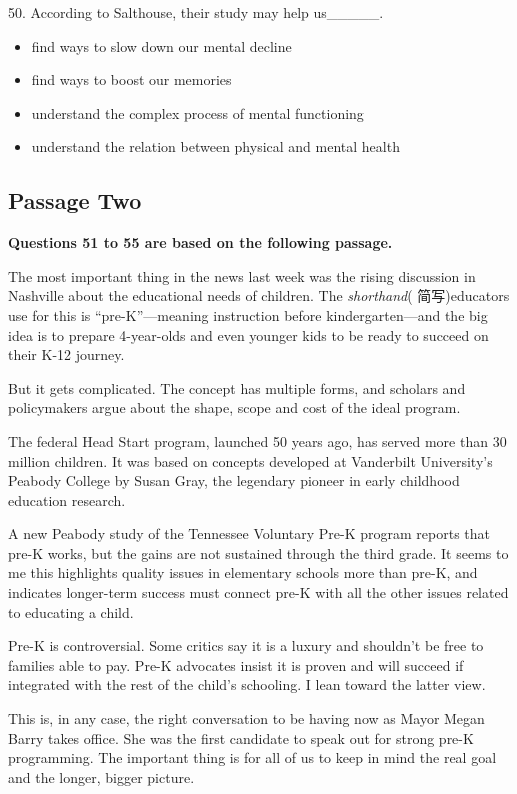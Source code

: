 \documentclass[UTF8,11pt]{ctexart}
\begin{document}
50. According to Salthouse, their study may help us\_\_\_\_\_.


\begin{itemize}[leftmargin=2em,itemsep=.2em,topsep=.4em]\item[A.] find ways to slow down our mental decline
\item[B.] find ways to boost our memories
\item[C.] understand the complex process of mental functioning
\item[D.] understand the relation between physical and mental health
\end{itemize}

\subsection*{\textbf{Passage Two}}


\textbf{Questions 51 to 55 are based on the following passage.}


The most important thing in the news last week was the rising discussion in Nashville about the educational needs of children. The\textit{ shorthand}( 简写)educators use for this is “pre-K”—meaning instruction before kindergarten—and the big idea is to prepare 4-year-olds and even younger kids to be ready to succeed on their K-12 journey.


But it gets complicated. The concept has multiple forms, and scholars and policymakers argue about the shape, scope and cost of the ideal program.


The federal Head Start program, launched 50 years ago, has served more than 30 million children. It was based on concepts developed at Vanderbilt University’s Peabody College by Susan Gray, the legendary pioneer in early childhood education research.


A new Peabody study of the Tennessee Voluntary Pre-K program reports that pre-K works, but the gains are not sustained through the third grade. It seems to me this highlights quality issues in elementary schools more than pre-K, and indicates longer-term success must connect pre-K with all the other issues related to educating a child.


Pre-K is controversial. Some critics say it is a luxury and shouldn’t be free to families able to pay. Pre-K advocates insist it is proven and will succeed if integrated with the rest of the child’s schooling. I lean toward the latter view.


This is, in any case, the right conversation to be having now as Mayor Megan Barry takes office. She was the first candidate to speak out for strong pre-K programming. The important thing is for all of us to keep in mind the real goal and the longer, bigger picture.
\end{document}
